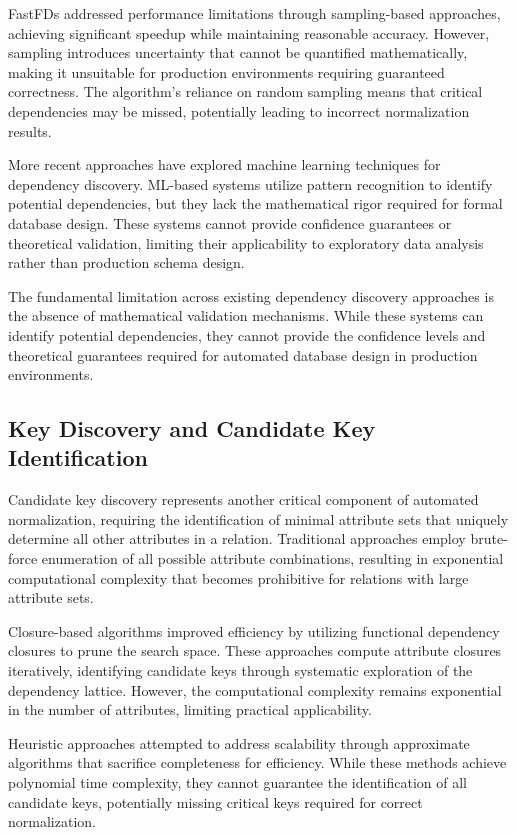 \documentclass[acmsmall]{acmart}
\begin{document}
FastFDs \cite{fastfds2008} addressed performance limitations through sampling-based approaches, achieving significant speedup while maintaining reasonable accuracy. However, sampling introduces uncertainty that cannot be quantified mathematically, making it unsuitable for production environments requiring guaranteed correctness. The algorithm's reliance on random sampling means that critical dependencies may be missed, potentially leading to incorrect normalization results.

More recent approaches have explored machine learning techniques for dependency discovery. ML-based systems \cite{ml_deps2018} utilize pattern recognition to identify potential dependencies, but they lack the mathematical rigor required for formal database design. These systems cannot provide confidence guarantees or theoretical validation, limiting their applicability to exploratory data analysis rather than production schema design.

The fundamental limitation across existing dependency discovery approaches is the absence of mathematical validation mechanisms. While these systems can identify potential dependencies, they cannot provide the confidence levels and theoretical guarantees required for automated database design in production environments.

\subsection{Key Discovery and Candidate Key Identification}

Candidate key discovery represents another critical component of automated normalization, requiring the identification of minimal attribute sets that uniquely determine all other attributes in a relation. Traditional approaches employ brute-force enumeration of all possible attribute combinations, resulting in exponential computational complexity that becomes prohibitive for relations with large attribute sets.

Closure-based algorithms \cite{closure_keys1995} improved efficiency by utilizing functional dependency closures to prune the search space. These approaches compute attribute closures iteratively, identifying candidate keys through systematic exploration of the dependency lattice. However, the computational complexity remains exponential in the number of attributes, limiting practical applicability.

Heuristic approaches \cite{heuristic_keys2003} attempted to address scalability through approximate algorithms that sacrifice completeness for efficiency. While these methods achieve polynomial time complexity, they cannot guarantee the identification of all candidate keys, potentially missing critical keys required for correct normalization.
\end{document}
